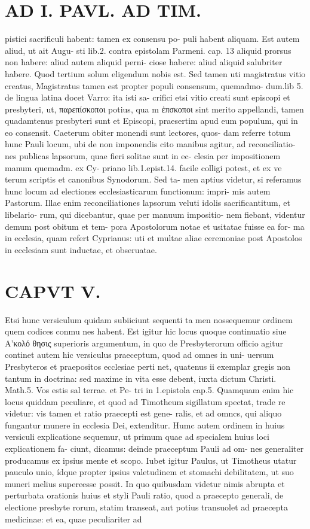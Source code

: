 \documentclass{article}
\begin{document}
\begin{pages}
\section*{AD I. PAVL. AD TIM. }
\marginpar{[ p.326 ]}pistici sacrificuli habent: tamen ex consensu po- puli habent aliquam. Est autem aliud, ut ait Augu- sti lib.2. contra epistolam Parmeni. cap. 13 aliquid prorsus non habere: aliud autem aliquid perni- ciose habere: aliud aliquid salubriter habere. Quod tertium solum eligendum nobis est. Sed tamen uti magistratus vitio creatus, Magistratus tamen est propter populi consensum, quemadmo- dum.lib 5. de lingua latina docet Varro: ita isti sa- crifici etsi vitio creati sunt episcopi et presbyteri, ut, παρεπίσκοποι potius, qua m ἐπσκοποι sint merito appellandi, tamen quadamtenus presbyteri sunt et Episcopi, praesertim apud eum populum, qui in eo consensit. Caeterum obiter monendi sunt lectores, quos- dam referre totum hunc Pauli locum, ubi de non imponendis cito manibus agitur, ad reconciliatio- nes publicas lapsorum, quae fieri solitae sunt in ec- clesia per impositionem manum quemadm. ex Cy- priano lib.1.epist.14. facile colligi potest, et ex ve terum scriptis et canonibus Synodorum. Sed ta- men aptius videtur, si referamus hunc locum ad electiones ecclesiasticarum functionum: impri- mis autem Pastorum. Illae enim reconciliationes lapsorum veluti idolis sacrificantitum, et libelario- rum, qui dicebantur, quae per manuum impositio- nem fiebant, videntur demum post obitum et tem- pora Apostolorum notae et usitatae fuisse ea for- ma in ecclesia, quam refert Cyprianus: uti et multae aliae ceremoniae post Apostolos in ecclesiam sunt inductae, et obseruatae.  
\section*{CAPVT  V. }
\marginpar{[ p.123 ]}  Etsi hunc versiculum quidam subiiciunt sequenti ta men nossequemur ordinem quem codices conmu nes habent. Est igitur hic locus quoque continuatio siue Α’κολό θησις superioris argumentum, in quo de Presbyterorum officio agitur continet autem hic versiculus praeceptum, quod ad omnes in uni- uersum Presbyteros et praepositos ecclesiae perti net, quatenus ii exemplar gregis non tantum in doctrina: sed maxime in vita esse debent, iuxta dictum Christi. Math.5. Vos estis sal terrae. et Pe- tri in 1.epistola cap.5. Quamquam enim hic locus quiddam peculiare, et quod ad Timotheum sigillatum spectat, trade re videtur: vis tamen et ratio praecepti est gene- ralis, et ad omncs, qui aliquo fungantur munere in ecclesia Dei, extenditur. Humc autem ordinem in huius versiculi explicatione sequemur, ut primum quae ad specialem huius loci explicationem fa- ciunt, dicamus: deinde praeceptum Pauli ad om- nes generaliter producamus ex ipsius mente et scopo. Iubet igitur Paulus, ut Timotheus utatur pauculo unio, ídque propter ipsius valetudinem et stomachi debilitatem, ut suo muneri melius supereesse possit. In quo quibusdam videtur nimis abrupta et perturbata orationis huius et styli Pauli ratio, quod a praecepto generali, de electione presbyte rorum, statim transeat, aut potius transuolet ad praecepta medicinae: et ea, quae peculiariter ad 

\end{pages}
\end{document}
